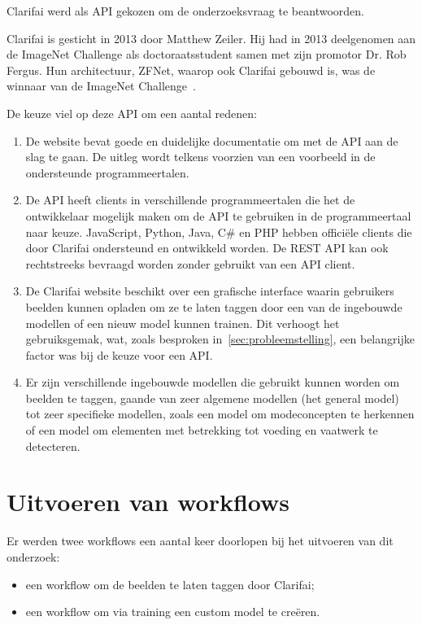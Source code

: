 Clarifai werd als API gekozen om de onderzoeksvraag te beantwoorden. 

Clarifai is gesticht in 2013 door Matthew Zeiler. Hij had in 2013 deelgenomen aan de ImageNet Challenge als doctoraatsstudent samen met zijn promotor Dr. Rob Fergus. Hun architectuur, ZFNet, waarop ook Clarifai gebouwd is, was de winnaar van de ImageNet Challenge~\autocite{Tsang2018}.

De keuze viel op deze API om een aantal redenen:
\begin{enumerate}
	\item De website bevat goede en duidelijke documentatie om met de API aan de slag te gaan. De uitleg wordt telkens voorzien van een voorbeeld in de ondersteunde programmeertalen. %
	\item De API heeft clients in verschillende programmeertalen die het de ontwikkelaar mogelijk maken om de API te gebruiken in de programmeertaal naar keuze. JavaScript, Python, Java, C\# en PHP hebben officiële clients die door Clarifai ondersteund en ontwikkeld worden. De REST API kan ook rechtstreeks bevraagd worden zonder gebruikt van een API client.
	\item De Clarifai website beschikt over een grafische interface waarin gebruikers beelden kunnen opladen om ze te laten taggen door een van de ingebouwde modellen of een nieuw model kunnen trainen. Dit verhoogt het gebruiksgemak, wat, zoals besproken in~\ref{sec:probleemstelling}, een belangrijke factor was bij de keuze voor een API.
	\item Er zijn verschillende ingebouwde modellen die gebruikt kunnen worden om beelden te taggen, gaande van zeer algemene modellen (het general model) tot zeer specifieke modellen, zoals een model om modeconcepten te herkennen of een model om elementen met betrekking tot voeding en vaatwerk te detecteren.
\end{enumerate}

\section{Uitvoeren van workflows}
\label{sec:uitvoeren-workflows}

Er werden twee workflows een aantal keer doorlopen bij het uitvoeren van dit onderzoek:
\begin{itemize}
	\item een workflow om de beelden te laten taggen door Clarifai;
	\item een workflow om via training een custom model te cre\"{e}ren.
\end{itemize}

